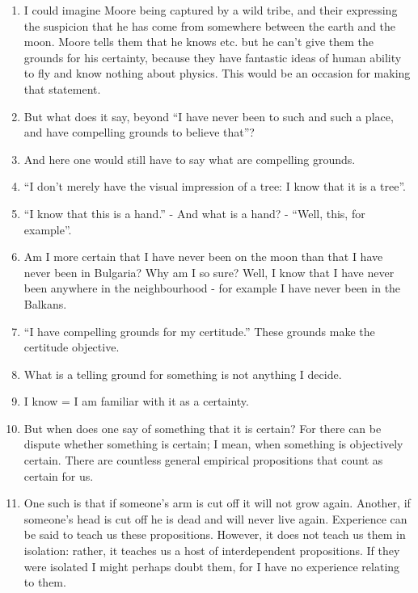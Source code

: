 \documentclass{book}
\begin{document}
\begin{enumerate}
\item
I could imagine Moore being captured by a wild tribe, and their expressing the
suspicion that he has come from somewhere between the earth and the moon. Moore
tells them that he knows etc. but he can't give them the grounds for his
certainty, because they have fantastic ideas of human ability to fly and know
nothing about physics. This would be an occasion for making that statement.

\item
But what does it say, beyond ``I have never been to such and such a place, and
have compelling grounds to believe that''?

\item
And here one would still have to say what are compelling grounds.

\item
``I don't merely have the visual impression of a tree: I know that it is a
tree''.

\item
``I know that this is a hand.'' - And what is a hand? - ``Well, this, for
example''.

\item
Am I more certain that I have never been on the moon than that I have never
been in Bulgaria? Why am I so sure? Well, I know that I have never been
anywhere in the neighbourhood - for example I have never been in the Balkans.

\item
``I have compelling grounds for my certitude.'' These grounds make the
certitude objective.

\item
What is a telling ground for something is not anything I decide.

\item
I know = I am familiar with it as a certainty.

\item
But when does one say of something that it is certain?  For there can be
dispute whether something is certain; I mean, when something is objectively
certain.  There are countless general empirical propositions that count as
certain for us.

\item
One such is that if someone's arm is cut off it will not grow again. Another,
if someone's head is cut off he is dead and will never live again.  Experience
can be said to teach us these propositions. However, it does not teach us them
in isolation: rather, it teaches us a host of interdependent propositions. If
they were isolated I might perhaps doubt them, for I have no experience
relating to them.


\end{enumerate}
\end{document}
